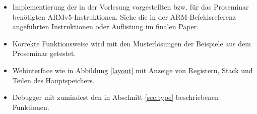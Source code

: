 \documentclass[a4paper, 11pt, onecolumn]{article}
\begin{document}
\begin{itemize}
\item Implementierung der in der Vorlesung vorgestellten bzw. für das Proseminar benötigten ARMv5-Instruktionen. Siehe die in der ARM-Befehlsreferenz angeführten Instruktionen oder Auflistung im finalen Paper.
\item Korrekte Funktionsweise wird mit den Musterlösungen der Beispiele aus dem Proseminar getestet.
\item Webinterface wie in Abbildung \ref{layout} mit Anzeige von Registern, Stack und Teilen des Hauptspeichers.
\item Debugger mit zumindest den in Abschnitt \ref{sec:type} beschriebenen Funktionen.
\end{itemize}




\end{document}
